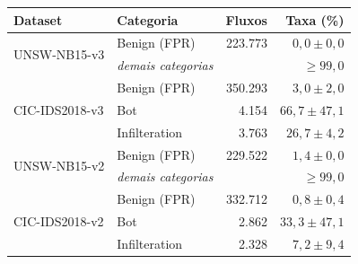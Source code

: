 \begin{tabular}{llrr}
\toprule
Dataset & Categoria & Fluxos & Taxa (\%) \\
\midrule
\multirow{2}{*}{UNSW-NB15-v3} & Benign (FPR) & 223.773 & $0,0 \pm 0,0$ \\
& \emph{demais categorias} & & $\ge 99{,}0$ \\
\midrule
\multirow{3}{*}{CIC-IDS2018-v3} & Benign (FPR) & 350.293 & $3,0 \pm 2,0$ \\
 & Bot & 4.154 & $66,7 \pm 47,1$ \\
 & Infilteration & 3.763 & $26,7 \pm 4,2$ \\
\midrule
\multirow{2}{*}{UNSW-NB15-v2} & Benign (FPR) & 229.522 & $1,4 \pm 0,0$ \\
& \emph{demais categorias} & & $\ge 99{,}0$ \\
\midrule
\multirow{3}{*}{CIC-IDS2018-v2} & Benign (FPR) & 332.712 & $0,8 \pm 0,4$ \\
 & Bot & 2.862 & $33,3 \pm 47,1$ \\
 & Infilteration & 2.328 & $7,2 \pm 9,4$ \\
\bottomrule
\end{tabular}
